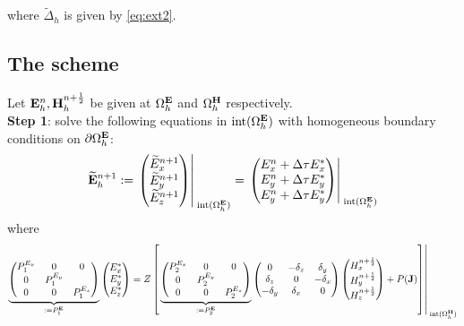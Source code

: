 \documentclass[12pt,reqno]{amsart}
\newcommand{\e}{{\bf E}}
\newcommand{\h}{{\bf H}}
\theoremstyle{definition}
\numberwithin{equation}{section}
\newcommand{\intr}[1]{\mathrm{int}(#1)}
\def\Gwh{\Omega_h}
\begin{document}
where $\tilde{\Delta}_h$ is given by \eqref{eq:ext2}.
\subsection{The scheme}

	Let $\e^n_h, \h^{n+\frac{1}{2}}_h$  be given at $\Gwh^{\e}$ and $\Gwh^{\h}$ respectively. \\[2mm]
	{\bf Step 1}: solve the following equations in $\intr{\Gwh^{\e}}$ with
	 homogeneous boundary conditions on $\partial \Gwh^\e$: \\[2mm]
	$$
	\widetilde{\e}_h^{n+1}:=
	\left.
	\begin{pmatrix}
		\widetilde{E}_x^{n+1}\\
		\widetilde{E}_y^{n+1}\\
		\widetilde{E}_z^{n+1}
	\end{pmatrix}\right|_{\; \intr{\Gwh^{\e}}}^{\;}=
\left.
	\begin{pmatrix}
		E_x^n+\Delta \tau E_x^{*}\\
		E_y^n+\Delta \tau E_y^{*}\\
		E_y^n+\Delta \tau E_y^{*}
	\end{pmatrix}\right|_{\; \intr{\Gwh^{\e}}}^{\;}
	$$
	where 
	$$
	\underbrace{
	\begin{pmatrix}
		P_1^{E_x} & 0&0 \\
		0 & P_1^{E_y} &\\
		0&0&P_1^{E_z} 
	\end{pmatrix}
}_{:=P_1^\e}
	\begin{pmatrix}
		E_x^{*}\\
		E_y^{*} \\
		E_z^{*}
	\end{pmatrix}=Z
\left [ \left.
	\underbrace{
	\begin{pmatrix}
		P_2^{E_x} & 0&0 \\
		0 & P_2^{E_y} &\\
		0&0&P_2^{E_z} 
	\end{pmatrix}
}_{:=P_2^\e}
	\begin{pmatrix}
		0& -\delta_z & \delta _y\\
		\delta_z&0&-\delta_x\\
		-\delta_y&\delta_x&0
	\end{pmatrix}
	\begin{pmatrix}
		H_x^{n+\frac{1}{2}}\\
		H_y^{n+\frac{1}{2}}\\
		H_z^{n+\frac{1}{2}}
	\end{pmatrix}+P({\bf J})\right]\right|_{\; \intr{\Gwh^{\h}}}^{\;}
	$$
\end{document}
